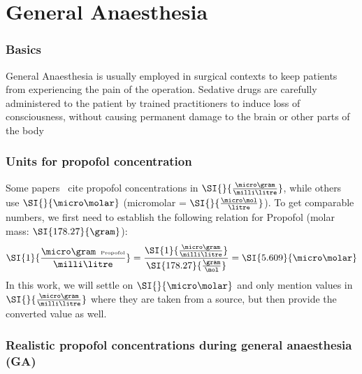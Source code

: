 \section{General Anaesthesia}\label{sec:general-anaesthesia}
\subsubsection{Basics}
General Anaesthesia is usually employed in surgical contexts to keep patients from experiencing the pain of the
operation.
Sedative drugs are carefully administered to the patient by trained practitioners to induce loss of consciousness,
without causing permanent damage to the brain or other parts of the body



\subsubsection{Units for propofol concentration}
Some papers~\cite{iwakiri_individual_2005} cite propofol concentrations in $\SI{}{\frac{\micro\gram}{\milli\litre}}$,
while others~\cite{kitamura_effects_2003, mcdougall_propofol_2008} use $\SI{}{\micro\molar}$ (micromolar =
$\SI{}{\frac{\micro\mol}{\litre}}$).
To get comparable numbers, we first need to establish the following relation for Propofol (molar mass: $\SI{178
.27}{\gram}$):
\[ \SI{1}{\frac{\micro\gram\hspace{0.5em}\text{\tiny{Propofol}}}{\milli\litre}}  =
\frac{ \SI{1}{\frac{\micro\gram}{\milli\litre}}}{\SI{178.27}{\frac{\gram}{\mol}}} = \SI{5.609}{\micro\molar} \]
In this work, we will settle on $\SI{}{\micro\molar}$
and only mention values in $\SI{}{\frac{\micro\gram}{\milli\litre}}$ where they are taken from a source,
but then provide the converted value as well.


\subsubsection{Realistic propofol concentrations during general anaesthesia (GA)}\label{subsec:realistic-prop-conc-during-ga}

